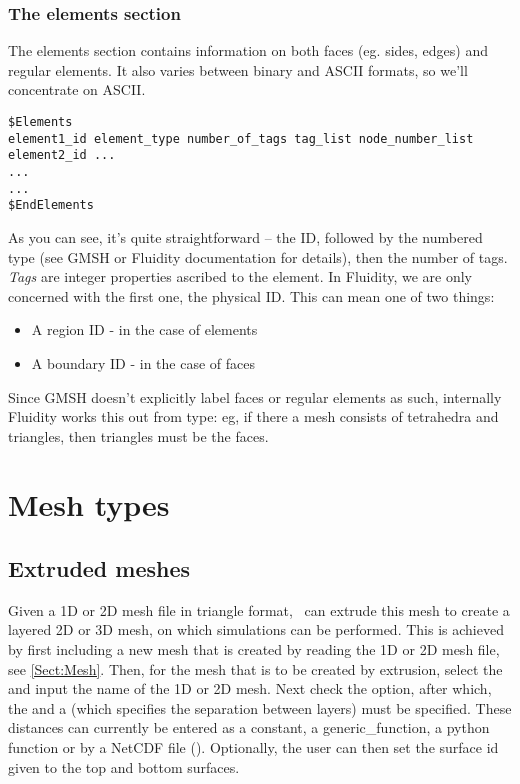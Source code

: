 \subsubsection*{The elements section}\label{sect:gmsh_elements_section}

The elements section contains information on both faces (eg. sides, edges) and regular elements. It also varies between binary and ASCII formats, so we'll concentrate on ASCII. 

\begin{lstlisting}
$Elements
element1_id element_type number_of_tags tag_list node_number_list
element2_id ...
...
...
$EndElements
\end{lstlisting}
As you can see, it's quite straightforward -- the ID, followed by the numbered type (see GMSH or Fluidity documentation for details), then the number of tags. \textit{Tags} are integer properties ascribed to the element. In Fluidity, we are only concerned with the first one, the physical ID. This can mean one of two things:


\begin{itemize}
\item A region ID - in the case of elements
\item A boundary ID - in the case of faces
\end{itemize}

Since GMSH doesn't explicitly label faces or regular elements as such, internally Fluidity works this out from type: eg, if there a mesh consists of tetrahedra and triangles, then triangles must be the faces.

\section{Mesh types}
\subsection{Extruded meshes}
\label{sect:extruded_meshes}

Given a 1D or 2D mesh file in triangle format, \fluidity\ can extrude this mesh to create a layered 2D or 3D mesh, 
on which simulations can be performed. This is achieved by first including a new mesh that is created by reading the 1D or 2D mesh file, see \ref{Sect:Mesh}. Then, for the mesh that is to be created by extrusion, select the  and input the name of the 1D or 2D mesh. Next check the  option, after which, the  and 
a  (which specifies the separation between layers) must be specified. These distances can 
currently be entered as a constant, a generic\_function, a python function or by a NetCDF 
file (\website). Optionally, the user can then set the surface id given to the top and bottom surfaces. 

